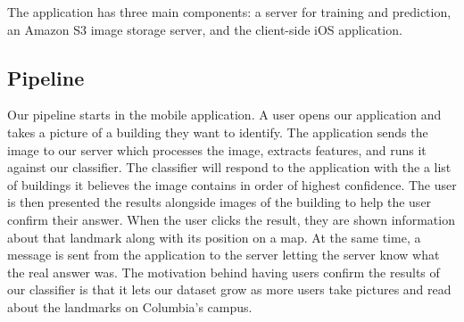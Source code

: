 The application has three main components: a server for training and prediction, an Amazon S3 image storage server, and the client-side iOS application. 

\subsection{Pipeline}
Our pipeline starts in the mobile application. A user opens our application and takes a picture of a building they want to identify. The application sends the image to our server which processes the image, extracts features, and runs it against our classifier. The classifier will respond to the application with the a list of buildings it believes the image contains in order of highest confidence. The user is then presented the results alongside images of the building to help the user confirm their answer. When the user clicks the result, they are shown information about that landmark along with its position on a map. At the same time, a message is sent from the application to the server letting the server know what the real answer was. The motivation behind having users confirm the results of our classifier is that it lets our dataset grow as more users take pictures and read about the landmarks on Columbia's campus.
